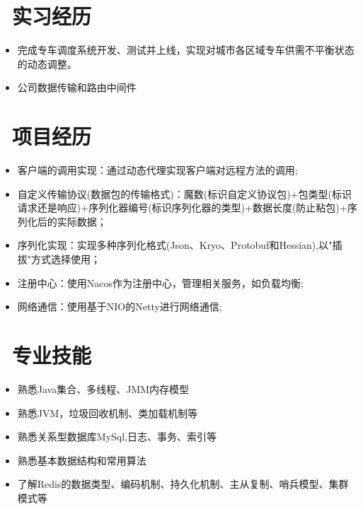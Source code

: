 \documentclass{resume}
\begin{document}
\vspace{1.2ex}

\section{\faSitemap\ 实习经历}
\vspace{-0.5ex}
\begin{onehalfspacing}
\begin{itemize}
  \item 完成专车调度系统开发、测试并上线，实现对城市各区域专车供需不平衡状态的动态调整。
  \item 公司数据传输和路由中间件
\end{itemize}
\end{onehalfspacing}

\vspace{1.2ex}

\section{\faUsers\ 项目经历}
\begin{itemize}
  \item 客户端的调用实现：通过动态代理实现客户端对远程方法的调用;
  \item 自定义传输协议(数据包的传输格式)：魔数(标识自定义协议包)+包类型(标识请求还是响应)+序列化器编号(标识序列化器的类型)+数据长度(防止粘包)+序列化后的实际数据；
  \item 序列化实现：实现多种序列化格式(Json、Kryo、Protobuf和Hessian),以"插拔"方式选择使用；
  \item 注册中心：使用Nacos作为注册中心，管理相关服务，如负载均衡;
  \item 网络通信：使用基于NIO的Netty进行网络通信;
\end{itemize}

\vspace{1.2ex}


\section{\faCogs\ 专业技能}
\begin{itemize}[parsep=0.5ex]
  \item 熟悉Java集合、多线程、JMM内存模型
  \item 熟悉JVM，垃圾回收机制、类加载机制等
  \item 熟悉关系型数据库MySql,日志、事务、索引等
  \item 熟悉基本数据结构和常用算法
  \item 了解Redis的数据类型、编码机制、持久化机制、主从复制、哨兵模型、集群模式等
\end{itemize}
\end{document}
